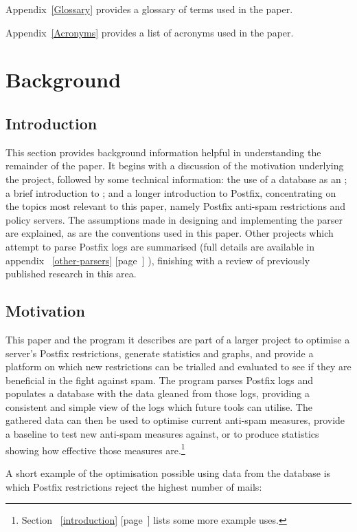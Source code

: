 \documentclass[a4paper,12pt,draft]{article}
\newcommand{\refwithpage}[1]{%
    \empty{}\ref{#1} [page~\pageref{#1}]%
}
\begin{document}
Appendix~\ref{Glossary} provides a glossary of terms used in the paper.

Appendix~\ref{Acronyms} provides a list of acronyms used in the paper.

\section{Background}

\label{background}

\subsection{Introduction}

This section provides background information helpful in understanding the
remainder of the paper.  It begins with a discussion of the motivation
underlying the project, followed by some technical information: the use of
a database as an \API{}\@; a brief introduction to
 \SMTP{}\@; and a longer introduction to
Postfix, concentrating on the topics most relevant to this paper, namely
Postfix anti-spam restrictions and policy servers.  The assumptions made in
designing and implementing the parser are explained, as are the conventions
used in this paper.  Other projects which attempt to parse Postfix logs are
summarised (full details are available in
appendix~\refwithpage{other-parsers}), finishing with a review of
previously published research in this area.

\subsection{Motivation}

This paper and the program it describes are part of a larger project to
optimise a server's Postfix restrictions, generate statistics and graphs,
and provide a platform on which new restrictions can be trialled and
evaluated to see if they are beneficial in the fight against spam.  The
program parses Postfix logs and populates a database with the data gleaned
from those logs, providing a consistent and simple view of the logs which
future tools can utilise.  The gathered data can then be used to optimise
current anti-spam measures, provide a baseline to test new anti-spam
measures against, or to produce statistics showing how effective those
measures are.\footnote{Section~\refwithpage{introduction} lists some more
example uses.}

A short example of the optimisation possible using data from the database
is which Postfix restrictions reject the highest number of mails:
\end{document}
